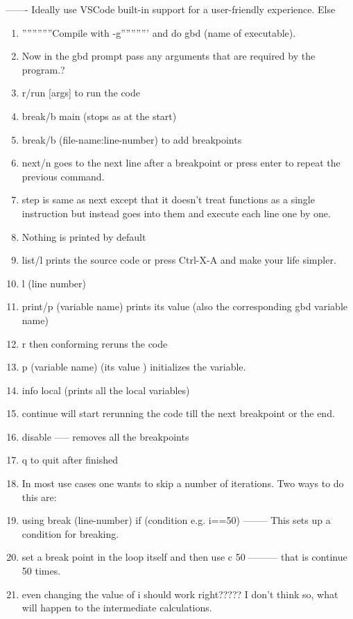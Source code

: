 ------- Ideally use VSCode built-in support for a user-friendly experience. Else
\begin{enumerate}
    \item ''''''''''''Compile with -g''''''''''' and do gbd (name of executable).
    \item Now in the gbd prompt pass any arguments that are required by the program.?
    \item r/run [args] to run the code
    \item break/b main (stops as at the start)
    \item break/b (file-name:line-number) to add breakpoints
    \item next/n goes to the next line after a breakpoint or press enter to repeat the previous command.
    \item step is same as next except that it doesn't treat functions as a single instruction but instead goes into them and execute each line one by one.
    \item Nothing is printed by default
    \item list/l prints the source code or press Ctrl-X-A and make your life simpler.
    \item l (line number)
    \item print/p (variable name) prints its value (also the corresponding gbd variable name)
    \item r then conforming reruns the code 
    \item p (variable name) (its value ) initializes the variable.
    \item info local (prints all the local variables)
    \item continue will start rerunning the code till the next breakpoint or the end.
    \item disable ----- removes all the breakpoints
    \item q to quit after finished
    
    
    
    \item In most use cases one wants to skip a number of iterations. Two ways to do this are: 
    \item using break (line-number) if (condition e.g. i==50)  -------- This sets up a condition for breaking.
    \item set a break point in the loop itself and then use c 50 --------- that is continue 50 times.
    \item even changing the value of i should work right????? I don't think so, what will happen to the intermediate calculations.
\end{enumerate}




